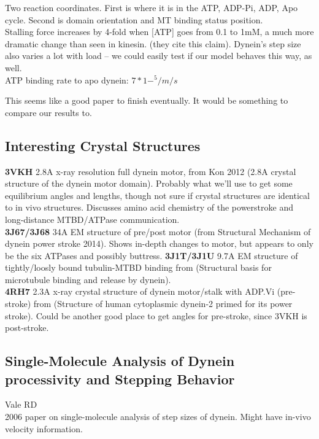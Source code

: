 \documentclass[10pt]{article} %
\begin{document}
Two reaction coordinates. First is where it is in the ATP, ADP-Pi, ADP, Apo cycle. Second is domain orientation and MT binding status position.\\

Stalling force increases by 4-fold when [ATP] goes from 0.1 to 1mM, a much more dramatic change than seen in kinesin. (they cite this claim). Dynein's step size also varies a lot with load -- we could easily test if our model behaves this way, as well.\\

ATP binding rate to apo dynein: $7*1-^5/m/s$

This seems like a good paper to finish eventually. It would be something to compare our results to.\\

\subsection{Interesting Crystal Structures}
\textbf{3VKH} 2.8A x-ray resolution full dynein motor, from Kon 2012 (2.8A crystal structure of the dynein motor domain). Probably what we'll use to get some equilibrium angles and lengths, though not sure if crystal structures are identical to in vivo structures. Discusses amino acid chemistry of the powerstroke and long-distance MTBD/ATPase communication.\\
\textbf{3J67/3J68} 34A EM structure of pre/post motor (from Structural Mechanism of dynein power stroke 2014). Shows in-depth changes to motor, but appears to only be the six ATPases and possibly buttress.
\textbf{3J1T/3J1U} 9.7A EM structure of tightly/loosly bound tubulin-MTBD binding from (Structural basis for microtubule binding and release by dynein).\\
\textbf{4RH7} 2.3A x-ray crystal structure of dynein motor/stalk with ADP.Vi (pre-stroke) from (Structure of human cytoplasmic dynein-2 primed for its power stroke). Could be another good place to get angles for pre-stroke, since 3VKH is post-stroke.\\

\subsection{Single-Molecule Analysis of Dynein processivity and Stepping Behavior}
Vale RD\\
2006 paper on single-molecule analysis of step sizes of dynein. Might have in-vivo velocity information.\\
\end{document}
